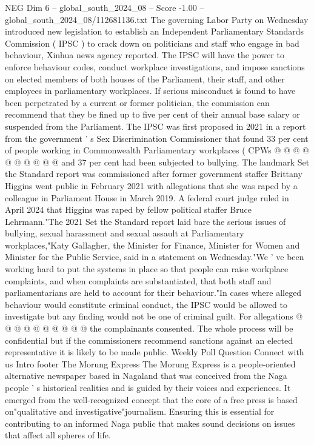 \begin{textsample}{NEG Dim 6 – global\_south\_2024\_08 – Score -1.00 – global\_south\_2024\_08/112681136.txt}
The governing Labor Party on Wednesday introduced new legislation to establish an Independent Parliamentary Standards Commission ( IPSC ) to crack down on politicians and staff who engage in bad behaviour, Xinhua news agency reported.
The IPSC will have the power to enforce behaviour codes, conduct workplace investigations, and impose sanctions on elected members of both houses of the Parliament, their staff, and other employees in parliamentary workplaces.
If serious misconduct is found to have been perpetrated by a current or former politician, the commission can recommend that they be fined up to five per cent of their annual base salary or suspended from the Parliament.
The IPSC was first proposed in 2021 in a report from the government ' s Sex Discrimination Commissioner that found 33 per cent of people working in Commonwealth Parliamentary workplaces ( CPWs @ @ @ @ @ @ @ @ @ @ and 37 per cent had been subjected to bullying.
The landmark Set the Standard report was commissioned after former government staffer Brittany Higgins went public in February 2021 with allegations that she was raped by a colleague in Parliament House in March 2019.
A federal court judge ruled in April 2024 that Higgins was raped by fellow political staffer Bruce Lehrmann."The 2021 Set the Standard report laid bare the serious issues of bullying, sexual harassment and sexual assault at Parliamentary workplaces,"Katy Gallagher, the Minister for Finance, Minister for Women and Minister for the Public Service, said in a statement on Wednesday."We ' ve been working hard to put the systems in place so that people can raise workplace complaints, and when complaints are substantiated, that both staff and parliamentarians are held to account for their behaviour."In cases where alleged behaviour would constitute criminal conduct, the IPSC would be allowed to investigate but any finding would not be one of criminal guilt.
For allegations @ @ @ @ @ @ @ @ @ @ the complainants consented.
The whole process will be confidential but if the commissioners recommend sanctions against an elected representative it is likely to be made public.
Weekly Poll Question Connect with us Intro footer The Morung Express The Morung Express is a people-oriented alternative newspaper based in Nagaland that was conceived from the Naga people ' s historical realities and is guided by their voices and experiences.
It emerged from the well-recognized concept that the core of a free press is based on"qualitative and investigative"journalism.
Ensuring this is essential for contributing to an informed Naga public that makes sound decisions on issues that affect all spheres of life.

\end{textsample}
